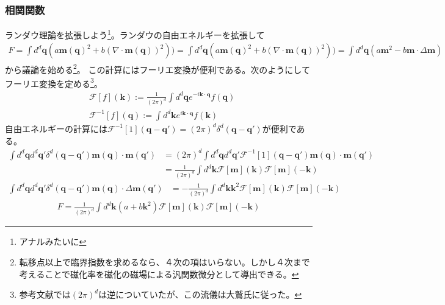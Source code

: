 \documentclass[autodetect-engine,dvipdfmx-if-dvi,ja=standard]{bxjsarticle}
\theoremstyle{break}
\begin{document}
            \subsubsection{相関関数}
                ランダウ理論を拡張しよう\footnote{アナルみたいに}。ランダウの自由エネルギーを拡張して
                \begin{align}
                    F=\int d^d \bm{q}(a\bm{m}(\bm{q})^2+b(\nabla\cdot\bm{m}(\bm{q}))^2))=\int d^d \bm{q}(a\bm{m}(\bm{q})^2+b(\nabla\cdot\bm{m}(\bm{q}))^2))=\int d^d \bm{q}(a\bm{m}^2-b\bm{m}\cdot \Delta \bm{m})
                    \label{2.47}
                \end{align}
                から議論を始める\footnote{転移点以上で臨界指数を求めるなら、４次の項はいらない。しかし４次まで考えることで磁化率を磁化の磁場による汎関数微分として導出できる。}。
                この計算にはフーリエ変換が便利である。次のようにしてフーリエ変換を定める\footnote{参考文献では$(2\pi)^d$は逆についていたが、この流儀は大鷲氏に従った。}。
                \begin{align}
                    &\mathcal{F}[f](\bm{k}):=\frac{1}{(2\pi)^d}\int d^d \bm{q}e^{-i\bm{k}\cdot\bm{q}}f(\bm{q})\\
                    &\mathcal{F}^{-1}[f](\bm{q}):=\int d^d \bm{k}e^{i\bm{k}\cdot\bm{q}}f(\bm{k})
                \end{align}
                自由エネルギーの計算には$\mathcal{F}^{-1}[1](\bm{q}-\bm{q}')=(2\pi)^d\delta^d (\bm{q}-\bm{q}')$が便利である。
                \begin{align}
                    \int d^d \bm{q}d^d \bm{q}' \delta^d (\bm{q}-\bm{q}') \bm{m}(\bm{q})\cdot\bm{m}(\bm{q}')
                    &=(2\pi)^d\int d^d \bm{q}d^d \bm{q}' \mathcal{F}^{-1}[1](\bm{q}-\bm{q}') \bm{m}(\bm{q})\cdot\bm{m}(\bm{q}')\\
                    &=\frac{1}{(2\pi)^d}\int d^d \bm{k}\mathcal{F}[\bm{m}](\bm{k})\mathcal{F}[\bm{m}](-\bm{k})
                \end{align}
                \begin{align}
                    \int d^d \bm{q}d^d \bm{q}' \delta^d (\bm{q}-\bm{q}') \bm{m}(\bm{q})\cdot \Delta \bm{m}(\bm{q}')
                    &=-\frac{1}{(2\pi)^d}\int d^d \bm{k}\bm{k}^2\mathcal{F}[\bm{m}](\bm{k})\mathcal{F}[\bm{m}](-\bm{k})
                \end{align}
                \begin{align}
                    F=\frac{1}{(2\pi)^d}\int d^d \bm{k}(a+b\bm{k}^2)\mathcal{F}[\bm{m}](\bm{k})\mathcal{F}[\bm{m}](-\bm{k})
                \end{align}
\end{document}
